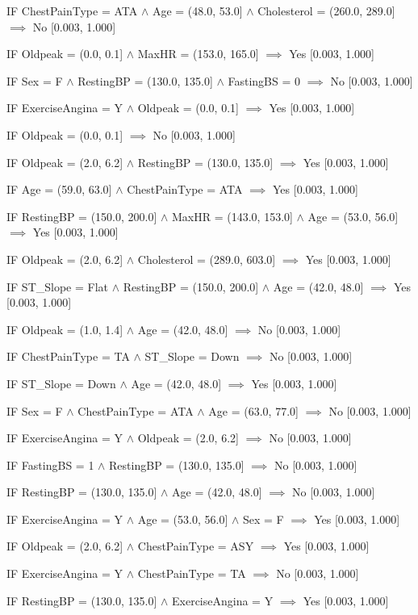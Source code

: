 IF ChestPainType = ATA $\land$ Age = (48.0, 53.0] $\land$ Cholesterol = (260.0, 289.0] $\implies$ No [0.003, 1.000]

IF Oldpeak = (0.0, 0.1] $\land$ MaxHR = (153.0, 165.0] $\implies$ Yes [0.003, 1.000]

IF Sex = F $\land$ RestingBP = (130.0, 135.0] $\land$ FastingBS = 0 $\implies$ No [0.003, 1.000]

IF ExerciseAngina = Y $\land$ Oldpeak = (0.0, 0.1] $\implies$ Yes [0.003, 1.000]

IF Oldpeak = (0.0, 0.1] $\implies$ No [0.003, 1.000]

IF Oldpeak = (2.0, 6.2] $\land$ RestingBP = (130.0, 135.0] $\implies$ Yes [0.003, 1.000]

IF Age = (59.0, 63.0] $\land$ ChestPainType = ATA $\implies$ Yes [0.003, 1.000]

IF RestingBP = (150.0, 200.0] $\land$ MaxHR = (143.0, 153.0] $\land$ Age = (53.0, 56.0] $\implies$ Yes [0.003, 1.000]

IF Oldpeak = (2.0, 6.2] $\land$ Cholesterol = (289.0, 603.0] $\implies$ Yes [0.003, 1.000]

IF ST_Slope = Flat $\land$ RestingBP = (150.0, 200.0] $\land$ Age = (42.0, 48.0] $\implies$ Yes [0.003, 1.000]

IF Oldpeak = (1.0, 1.4] $\land$ Age = (42.0, 48.0] $\implies$ No [0.003, 1.000]

IF ChestPainType = TA $\land$ ST_Slope = Down $\implies$ No [0.003, 1.000]

IF ST_Slope = Down $\land$ Age = (42.0, 48.0] $\implies$ Yes [0.003, 1.000]

IF Sex = F $\land$ ChestPainType = ATA $\land$ Age = (63.0, 77.0] $\implies$ No [0.003, 1.000]

IF ExerciseAngina = Y $\land$ Oldpeak = (2.0, 6.2] $\implies$ No [0.003, 1.000]

IF FastingBS = 1 $\land$ RestingBP = (130.0, 135.0] $\implies$ No [0.003, 1.000]

IF RestingBP = (130.0, 135.0] $\land$ Age = (42.0, 48.0] $\implies$ No [0.003, 1.000]

IF ExerciseAngina = Y $\land$ Age = (53.0, 56.0] $\land$ Sex = F $\implies$ Yes [0.003, 1.000]

IF Oldpeak = (2.0, 6.2] $\land$ ChestPainType = ASY $\implies$ Yes [0.003, 1.000]

IF ExerciseAngina = Y $\land$ ChestPainType = TA $\implies$ No [0.003, 1.000]

IF RestingBP = (130.0, 135.0] $\land$ ExerciseAngina = Y $\implies$ Yes [0.003, 1.000]

